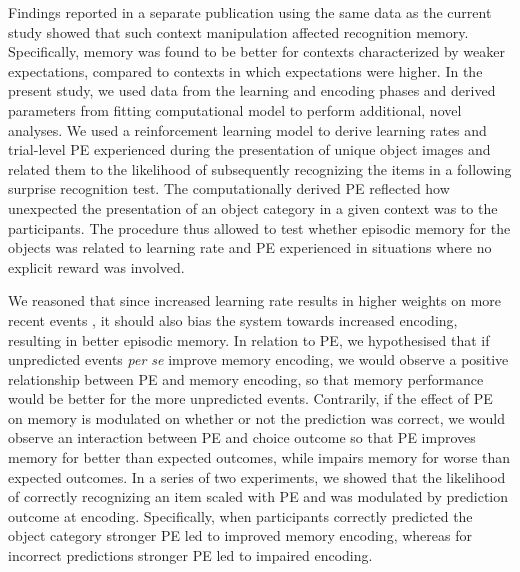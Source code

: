 \documentclass[a4paper,12pt]{article}
\begin{document}
Findings reported in a separate publication using the same data as the current study \citep{ortiz2021not} showed that such context manipulation affected recognition memory. Specifically, memory was found to be better for contexts characterized by weaker expectations, compared to contexts in which expectations were higher. In the present study, we used data from the learning and encoding phases and derived parameters from fitting computational model to perform additional, novel analyses. We used a reinforcement learning model to derive learning rates and trial-level PE experienced during the presentation of unique object images and related them to the likelihood of subsequently recognizing the items in a following surprise recognition test. The computationally derived PE reflected how unexpected the presentation of an object category in a given context was to the participants. The procedure thus allowed to test whether episodic memory for the objects was related to learning rate and PE experienced in situations where no explicit reward was involved.
\par
 We reasoned that since increased learning rate results in higher weights on more recent events \citep{Daw2013}, it should also bias the system towards increased encoding, resulting in better episodic memory. In relation to PE, we hypothesised that if unpredicted events \textit{per se} improve memory encoding, we would observe a positive relationship between PE and memory encoding, so that memory performance would be better for the more unpredicted events. Contrarily, if the effect of PE on memory is modulated on whether or not the prediction was correct, we would observe an interaction between PE and choice outcome so that PE improves memory for better than expected outcomes, while impairs memory for worse than expected outcomes. In a series of two experiments, we showed that the likelihood of correctly recognizing an item scaled with PE and was modulated by prediction outcome at encoding. Specifically, when participants correctly predicted the object category stronger PE led to improved memory encoding, whereas for incorrect predictions stronger PE led to impaired encoding. %
\end{document}
